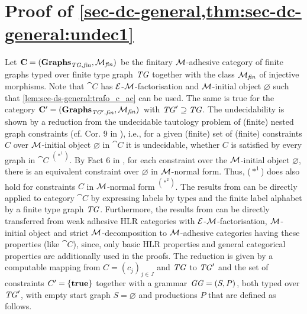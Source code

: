 \section{Proof of \cref{sec-dc-general,thm:sec-dc-general:undec1}}
\label{sec-proofs:thm:sec-dc-general:undec1}
Let $\mathbf{C}=(\mathbf{\mathbf{Graphs}_{\mathit{TG},\mathit{fin}},{\cal M}_\mathit{fin}})$ be the finitary ${\cal M}$-adhesive category of finite graphs typed over finite type graph $\mathit{TG}$ together with the class ${\cal M}_\mathit{fin}$ of injective morphisms.
Note that $\cat{C}$ has $\mathcal{E}$-${\cal M}$-factorisation and ${\cal M}$-initial object $\varnothing$ such that \cref{lem:sce-ds-general:trafo_c_ac} can be used.
The same is true for the category $\mathbf{C'}=(\mathbf{\mathbf{Graphs}_{\mathit{TG}',\mathit{fin}},{\cal M}_\mathit{fin}})$ with $\mathit{TG}' \supseteq \mathit{TG}$.
The undecidability is shown by a reduction from the undecidable tautology problem of (finite) nested graph constraints (cf. Cor. 9 in \cite{DBLP:journals/mscs/HabelP09}), i.e., for a given (finite) set of (finite) constraints $C$ over ${\cal M}$-initial object $\varnothing$ in $\cat{C}$ it is undecidable, whether $C$ is satisfied by every graph in $\cat{C}$ $^{(*^1)}$.
By Fact 6 in \cite{DBLP:journals/mscs/HabelP09}, for each constraint over the ${\cal M}$-initial object $\varnothing$, there is an equivalent constraint over $\varnothing$ in ${\cal M}$-normal form.
Thus, ($*^1$) does also hold for constraints $C$ in ${\cal M}$-normal form $^{(*^2)}$.
The results from \cite{DBLP:journals/mscs/HabelP09} can be directly applied to category $\cat{C}$ by expressing labels by types and the finite label alphabet by a finite type graph $\mathit{TG}$.
Furthermore, the results from \cite{DBLP:journals/mscs/HabelP09} can be directly transferred from weak adhesive HLR categories with $\mathcal{E}$-${\cal M}$-factorisation, ${\cal M}$-initial object and strict ${\cal M}$-decomposition to ${\cal M}$-adhesive categories having these properties (like $\cat{C}$), since, only basic HLR properties and general categorical properties are additionally used in the proofs.
The reduction is given by a computable mapping from $C=(c_j)_{j \in J}$ and $\mathit{TG}$ to $\mathit{TG}'$ and the set of constraints $C'=\{\textbf{true}\}$ together with a grammar $\mathit{GG}=(S,P)$, both typed over $\mathit{TG}'$, with empty start graph $S=\varnothing$ and productions $P$ that are defined as follows.
\begin{center}
\end{center}
